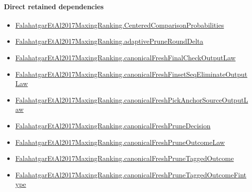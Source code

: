 \documentclass[10pt]{article}
\begin{document}
\paragraph{Direct retained dependencies}
\begin{itemize}\raggedright
\item \hyperlink{paper-prerequisite-b99b697ef57f53ce}{Falahatgar\allowbreak{}Et\allowbreak{}Al2017\allowbreak{}Maxing\allowbreak{}Ranking.\allowbreak{}Centered\allowbreak{}Comparison\allowbreak{}Probabilities}
\item \hyperlink{governing-declaration-0a2d9c4ad2e46f08}{Falahatgar\allowbreak{}Et\allowbreak{}Al2017\allowbreak{}Maxing\allowbreak{}Ranking.\allowbreak{}adaptive\allowbreak{}Prune\allowbreak{}Round\allowbreak{}Delta}
\item \hyperlink{governing-declaration-6f8a46fa91378263}{Falahatgar\allowbreak{}Et\allowbreak{}Al2017\allowbreak{}Maxing\allowbreak{}Ranking.\allowbreak{}canonical\allowbreak{}Fresh\allowbreak{}Final\allowbreak{}Check\allowbreak{}Output\allowbreak{}Law}
\item \hyperlink{governing-declaration-80739295f55f6395}{Falahatgar\allowbreak{}Et\allowbreak{}Al2017\allowbreak{}Maxing\allowbreak{}Ranking.\allowbreak{}canonical\allowbreak{}Fresh\allowbreak{}Finset\allowbreak{}Seq\allowbreak{}Eliminate\allowbreak{}Output\allowbreak{}Law}
\item \hyperlink{governing-declaration-c9504cf8a39d2ae0}{Falahatgar\allowbreak{}Et\allowbreak{}Al2017\allowbreak{}Maxing\allowbreak{}Ranking.\allowbreak{}canonical\allowbreak{}Fresh\allowbreak{}Pick\allowbreak{}Anchor\allowbreak{}Source\allowbreak{}Output\allowbreak{}Law}
\item \hyperlink{governing-declaration-5f4aa5a2143dcc9f}{Falahatgar\allowbreak{}Et\allowbreak{}Al2017\allowbreak{}Maxing\allowbreak{}Ranking.\allowbreak{}canonical\allowbreak{}Fresh\allowbreak{}Prune\allowbreak{}Decision}
\item \hyperlink{governing-declaration-2d276a1a3b14a7e3}{Falahatgar\allowbreak{}Et\allowbreak{}Al2017\allowbreak{}Maxing\allowbreak{}Ranking.\allowbreak{}canonical\allowbreak{}Fresh\allowbreak{}Prune\allowbreak{}Outcome\allowbreak{}Law}
\item \hyperlink{governing-declaration-3a0933a8178fc16e}{Falahatgar\allowbreak{}Et\allowbreak{}Al2017\allowbreak{}Maxing\allowbreak{}Ranking.\allowbreak{}canonical\allowbreak{}Fresh\allowbreak{}Prune\allowbreak{}Tagged\allowbreak{}Outcome}
\item \hyperlink{governing-declaration-6e0ce93b44515012}{Falahatgar\allowbreak{}Et\allowbreak{}Al2017\allowbreak{}Maxing\allowbreak{}Ranking.\allowbreak{}canonical\allowbreak{}Fresh\allowbreak{}Prune\allowbreak{}Tagged\allowbreak{}Outcome\allowbreak{}Fintype}

\end{itemize}
\end{document}
